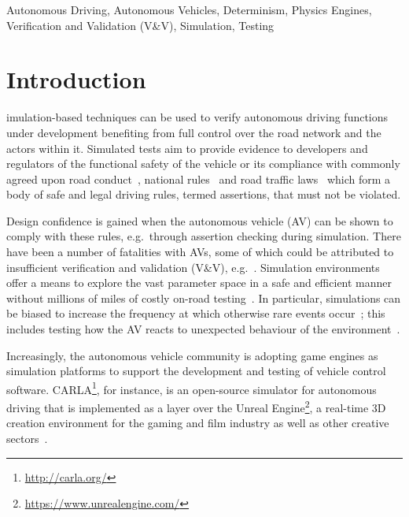 \documentclass[letterpaper, 10 pt, journal, twoside]{IEEEtran}
\begin{document}
\begin{IEEEkeywords}
Autonomous Driving, Autonomous Vehicles, Determinism, Physics Engines,  Verification and Validation (V\&V), Simulation, Testing
\end{IEEEkeywords}
\IEEEpeerreviewmaketitle

\section{Introduction} \label{s:introduction}
%
imulation-based techniques can be used to verify autonomous driving functions under development benefiting from full control over the road network and the actors within it. Simulated tests aim to provide evidence to developers and regulators of the functional safety of the vehicle or its compliance with commonly agreed upon road conduct~\cite{ViennaConv}, national rules~\cite{codes2015highway} and road traffic laws~\cite{RoadTraffic1988} which form a body of safe and legal driving rules, termed assertions, that must not be violated. 

Design confidence is gained when the autonomous vehicle (AV) can be shown to comply with these rules, e.g.\ through assertion checking during simulation. 
There have been a number of fatalities with AVs, some of which could be attributed to insufficient verification and validation (V\&V), e.g.~\cite{FatalityExample}. Simulation environments offer a means to explore the vast parameter space in a safe and efficient manner~\cite{korosec2019waymo} without millions of miles of costly on-road testing~\cite{kalra2016driving}. In particular, simulations can be biased to increase the frequency at which otherwise rare events occur~\cite{Koopman2018}; this includes testing how the AV reacts to unexpected behaviour of the environment~\cite{RobustnessAutonomy}. 

Increasingly, the autonomous vehicle community is adopting game engines as simulation platforms to support the development and testing of vehicle control software. 
%
CARLA\footnote{\url{http://carla.org/}}, for instance, is an open-source simulator for autonomous driving that is implemented as a layer over the Unreal Engine\footnote{\url{https://www.unrealengine.com/}}, a  real-time 3D creation environment for the gaming and film industry as well as other creative sectors~\cite{CARLA_paper}. 
\end{document}
